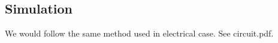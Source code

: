 \documentclass[xcolor=dvipsnames]{beamer}
\begin{document}
\subsection{Simulation}

\begin{frame}
	We would follow the same method used in electrical case. See circuit.pdf.
\end{frame}





	


\end{document}
